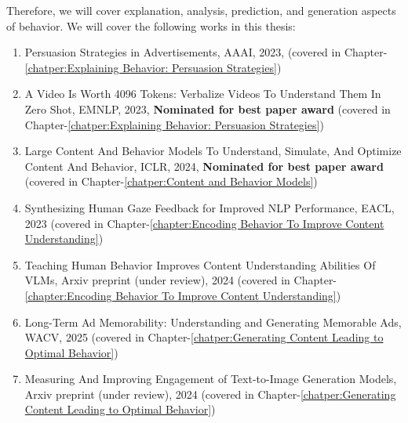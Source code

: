 Therefore, we will cover explanation, analysis, prediction, and generation aspects of behavior. We will cover the following works in this thesis:
\begin{enumerate}
    \item Persuasion Strategies in Advertisements, AAAI, 2023, (covered in Chapter-\ref{chatper:Explaining Behavior: Persuasion Strategies})
    \item A Video Is Worth 4096 Tokens: Verbalize Videos To Understand Them In Zero Shot, EMNLP, 2023, \textbf{Nominated for best paper award} (covered in Chapter-\ref{chatper:Explaining Behavior: Persuasion Strategies})
    \item Large Content And Behavior Models To Understand, Simulate, And Optimize Content And Behavior, ICLR, 2024, \textbf{Nominated for best paper award} (covered in Chapter-\ref{chatper:Content and Behavior Models})
    \item Synthesizing Human Gaze Feedback for Improved NLP Performance, EACL, 2023 (covered in Chapter-\ref{chapter:Encoding Behavior To Improve Content Understanding})
    \item Teaching Human Behavior Improves Content Understanding Abilities Of VLMs, Arxiv preprint (under review), 2024 (covered in Chapter-\ref{chapter:Encoding Behavior To Improve Content Understanding})
    \item Long-Term Ad Memorability: Understanding and Generating Memorable Ads, WACV, 2025 (covered in Chapter-\ref{chatper:Generating Content Leading to Optimal Behavior})
    \item Measuring And Improving Engagement of Text-to-Image Generation Models, Arxiv preprint (under review), 2024 (covered in Chapter-\ref{chatper:Generating Content Leading to Optimal Behavior})
\end{enumerate}



